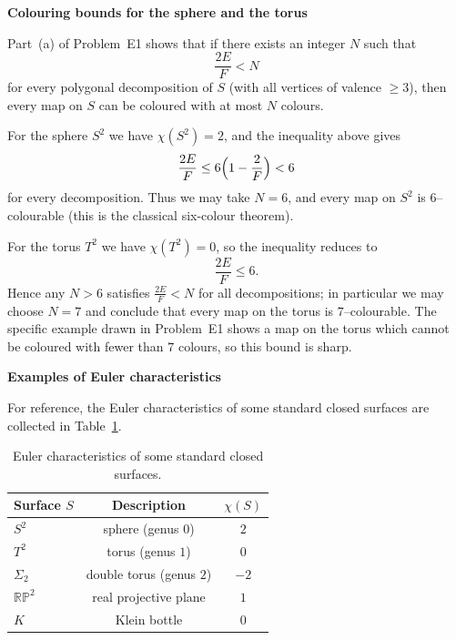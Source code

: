 \begin{problem}
	\par\medskip\noindent\textbf{Colouring bounds for the sphere and the torus}\par\smallskip

	
	Part~(a) of Problem~E1 shows that if there exists an integer $N$ such that
	\[
	\frac{2E}{F} < N
	\]
	for every polygonal decomposition of $S$ (with all vertices of valence
	$\ge 3$), then every map on $S$ can be coloured with at most $N$ colours.
	
	For the sphere $S^2$ we have $\chi(S^2)=2$, and the inequality above
	gives
	\[
	\frac{2E}{F} \le 6\Bigl(1 - \frac{2}{F}\Bigr) < 6
	\]
	for every decomposition.  Thus we may take $N=6$, and every map on $S^2$
	is $6$--colourable (this is the classical six-colour theorem).
	
	For the torus $T^2$ we have $\chi(T^2)=0$, so the inequality reduces to
	\[
	\frac{2E}{F} \le 6.
	\]
	Hence any $N>6$ satisfies $\frac{2E}{F} < N$ for all decompositions; in
	particular we may choose $N=7$ and conclude that every map on the torus is
	$7$--colourable.  The specific example drawn in Problem~E1 shows a map on
	the torus which cannot be coloured with fewer than $7$ colours, so this
	bound is sharp.
	
	\clearpage
	
	\par\medskip\noindent\textbf{Examples of Euler characteristics}\par\smallskip

	
	For reference, the Euler characteristics of some standard closed surfaces
	are collected in Table~\ref{tab:euler-surfaces}.
	
	\begin{table}[h]
		\centering
		\begin{tabular}{lcc}
			\hline
			Surface $S$ & Description & $\chi(S)$ \\
			\hline
			$S^2$ & sphere (genus $0$)          & $2$ \\
			$T^2$ & torus (genus $1$)           & $0$ \\
			$\Sigma_2$ & double torus (genus $2$) & $-2$ \\
			$\mathbb{RP}^2$ & real projective plane & $1$ \\
			$K$ & Klein bottle                  & $0$ \\
			\hline
		\end{tabular}
		\caption{Euler characteristics of some standard closed surfaces.}
		\label{tab:euler-surfaces}
	\end{table}
\end{problem}

